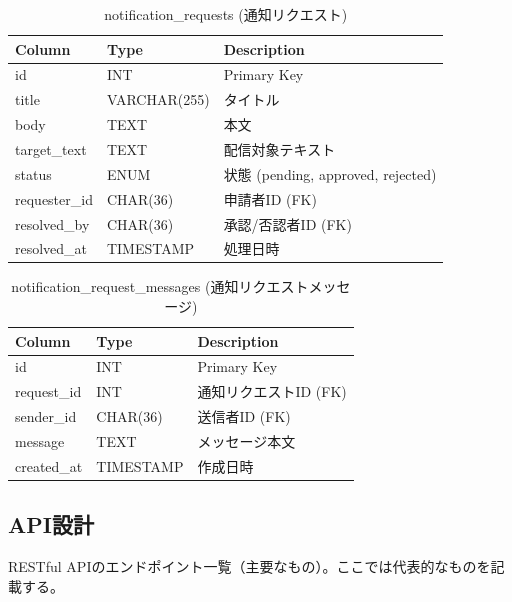\documentclass[paper=a4, fontsize=11pt]{jlreq}
\begin{document}
\begin{table}[H]
    \centering
    \caption{notification\_requests (通知リクエスト)}
    \begin{tabularx}{\textwidth}{|l|l|X|}
        \toprule
        Column & Type & Description \\
        \midrule
        id & INT & Primary Key \\
        title & VARCHAR(255) & タイトル \\
        body & TEXT & 本文 \\
        target\_text & TEXT & 配信対象テキスト \\
        status & ENUM & 状態 (pending, approved, rejected) \\
        requester\_id & CHAR(36) & 申請者ID (FK) \\
        resolved\_by & CHAR(36) & 承認/否認者ID (FK) \\
        resolved\_at & TIMESTAMP & 処理日時 \\
        \bottomrule
    \end{tabularx}
\end{table}

\begin{table}[H]
    \centering
    \caption{notification\_request\_messages (通知リクエストメッセージ)}
    \begin{tabularx}{\textwidth}{|l|l|X|}
        \toprule
        Column & Type & Description \\
        \midrule
        id & INT & Primary Key \\
        request\_id & INT & 通知リクエストID (FK) \\
        sender\_id & CHAR(36) & 送信者ID (FK) \\
        message & TEXT & メッセージ本文 \\
        created\_at & TIMESTAMP & 作成日時 \\
        \bottomrule
    \end{tabularx}
\end{table}

\subsection{API設計}
RESTful APIのエンドポイント一覧（主要なもの）。ここでは代表的なものを記載する。
\end{document}
